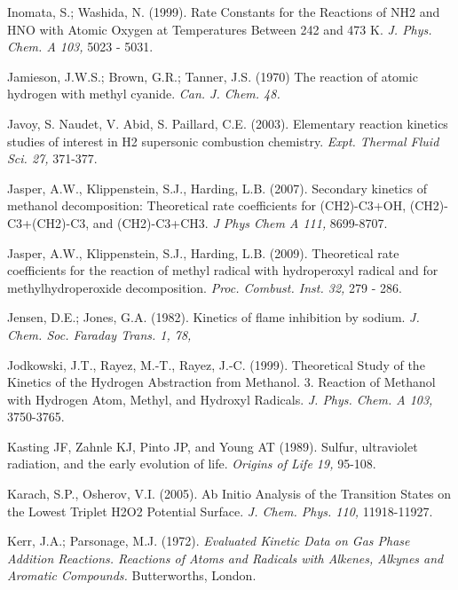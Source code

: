 \documentclass[12pt,landscape]{article}
\newcounter{reaction}
\begin{document}
Inomata, S.; Washida, N.  (1999). Rate Constants for the Reactions of NH2 and HNO with Atomic Oxygen at Temperatures Between 242 and 473 K. {\em  J. Phys. Chem. A 103,} 5023 - 5031.

Jamieson, J.W.S.; Brown, G.R.; Tanner, J.S. (1970)
The reaction of atomic hydrogen with methyl cyanide.
{\em Can. J. Chem. 48.}

Javoy, S. Naudet, V. Abid, S. Paillard, C.E. (2003).  Elementary reaction kinetics studies of interest in H2 supersonic combustion chemistry.  {\em Expt. Thermal Fluid Sci. 27,}  371-377.

Jasper, A.W., Klippenstein, S.J., Harding, L.B.  (2007). Secondary kinetics of methanol decomposition: Theoretical rate coefficients for (CH2)-C3+OH, (CH2)-C3+(CH2)-C3, and (CH2)-C3+CH3. {\em J Phys Chem A 111,} 8699-8707.

Jasper, A.W., Klippenstein, S.J., Harding, L.B.  (2009). Theoretical rate coefficients for the reaction of methyl radical with hydroperoxyl radical and for methylhydroperoxide decomposition.
{\em Proc. Combust. Inst. 32,} 279 - 286.

Jensen, D.E.; Jones, G.A. (1982). Kinetics of flame inhibition by sodium. {\em J. Chem. Soc. Faraday Trans. 1, 78,}

Jodkowski, J.T., Rayez, M.-T., Rayez, J.-C. (1999). Theoretical Study of the Kinetics of the Hydrogen Abstraction from Methanol. 3. Reaction of Methanol with Hydrogen Atom, Methyl, and Hydroxyl Radicals. {\em J. Phys. Chem. A 103,} 3750-3765. 
 
Kasting JF, Zahnle KJ, Pinto JP, and Young AT (1989). Sulfur, ultraviolet radiation, and the early evolution of life. {\em Origins of Life 19,} 95-108.

Karach, S.P., Osherov, V.I.  (2005). Ab Initio Analysis of the Transition States on the Lowest Triplet H2O2 Potential Surface. {\em J. Chem. Phys. 110,} 11918-11927.


Kerr, J.A.; Parsonage, M.J. (1972). {\em Evaluated Kinetic Data on Gas Phase Addition Reactions. Reactions of Atoms and Radicals with Alkenes, Alkynes and Aromatic Compounds.} Butterworths, London.
\end{document}
